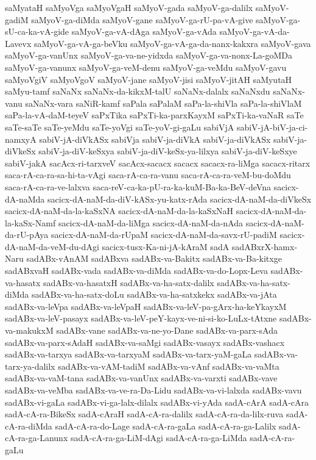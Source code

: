 {saMyataH
saMyoVga
saMyoVgaH
saMyoV-gada
saMyoV-ga-dalilx
saMyoV-gadiM
saMyoV-ga-diMda
saMyoV-gane
saMyoV-ga-rU-pa-vA-give
saMyoV-ga-sU-ca-ka-vA-gide
saMyoV-ga-vA-dAga
saMyoV-ga-vAda
saMyoV-ga-vA-da-Lavevx
saMyoV-ga-vA-ga-beVku
saMyoV-ga-vA-ga-da-nanx-kakxra
saMyoV-gava
saMyoV-ga-vanUnx
saMyoV-ga-va-ne-yidxda
saMyoV-ga-va-nonx-La-goMDa
saMyoV-ga-vanunx
saMyoV-ga-veM-denu
saMyoV-ga-veMdu
saMyoV-gavu
saMyoVgiV
saMyoVgoV
saMyoV-jane
saMyoV-jisi
saMyoV-jitAH
saMyutaH
saMyu-tamf
saNaNx
saNaNx-da-kikxM-talU
saNaNx-dalalx
saNaNxdu
saNaNx-vanu
saNaNx-vara
saNiR-kamf
saPala
saPalaM
saPa-la-shiVla
saPa-la-shiVlaM
saPa-la-vA-daM-teyeV
saPxTika
saPxTi-ka-parxKayxM
saPxTi-ka-vaNaR
saTe
saTe-saTe
saTe-yeMdu
saTe-yoVgi
saTe-yoV-gi-gaLu
sabiVjA
sabiV-jA-biV-ja-ci-namxyA
sabiV-jA-diVkASx
sabiVja
sabiV-ja-diVkA
sabiV-ja-diVkASx
sabiV-ja-diVkeSx
sabiV-ja-diV-keSxya
sabiV-ja-diV-keSx-ya-lilxya
sabiV-ja-diV-keSxye
sabiV-jakA
sacAcx-ri-tarxveV
sacAcx-sacacx
sacacx
sacacx-ra-liMga
sacacx-ritarx
saca-rA-ca-ra-sa-hi-ta-vAgi
saca-rA-ca-ra-vanu
saca-rA-ca-ra-veM-bu-doMdu
saca-rA-ca-ra-ve-lalxva
saca-reV-ca-ka-pU-ra-ka-kuM-Ba-ka-BeV-deVna
sacicx-dA-naMda
sacicx-dA-naM-da-diV-kASx-yu-katx-rAda
sacicx-dA-naM-da-diVkeSx
sacicx-dA-naM-da-la-kaSxNA
sacicx-dA-naM-da-la-kaSxNaH
sacicx-dA-naM-da-la-kaSx-Namf
sacicx-dA-naM-da-liMga
sacicx-dA-naM-da-nAda
sacicx-dA-naM-da-rU-pAya
sacicx-dA-naM-da-rUpaM
sacicx-dA-naM-da-savx-rU-padiM
sacicx-dA-naM-da-veM-du-dAgi
sacicx-tusx-Ka-ni-jA-kAraM
sadA
sadABxrX-hamx-Naru
sadABx-vAnAM
sadABxva
sadABx-va-Bakitx
sadABx-va-Ba-kitxge
sadABxvaH
sadABx-vada
sadABx-va-diMda
sadABx-va-do-Lopx-Leva
sadABx-va-hasatx
sadABx-va-hasatxH
sadABx-va-ha-satx-dalilx
sadABx-va-ha-satx-diMda
sadABx-va-ha-satx-doLu
sadABx-va-ha-satxkekx
sadABx-va-jAta
sadABx-va-leVpa
sadABx-va-leVpaH
sadABx-va-leV-pa-gArx-ha-keYkayxM
sadABx-va-leV-pasayx
sadABx-va-leV-peY-kayx-ve-ni-si-ko-LuLx-tAtxne
sadABx-va-makukxM
sadABx-vane
sadABx-va-ne-yo-Dane
sadABx-va-parx-sAda
sadABx-va-parx-sAdaH
sadABx-va-saMgi
sadABx-vasayx
sadABx-vashacx
sadABx-va-tarxya
sadABx-va-tarxyaM
sadABx-va-tarx-yaM-gaLa
sadABx-va-tarx-ya-dalilx
sadABx-va-vAM-tadiM
sadABx-va-vAnf
sadABx-va-vaMta
sadABx-va-vaM-tana
sadABx-va-vanUnx
sadABx-va-varxti
sadABx-vave
sadABx-va-veMba
sadABx-va-ve-ra-Da-Lidu
sadABx-va-vi-lalxda
sadABx-vavu
sadABx-vi-gaLa
sadABx-vi-ga-lalx-dilalx
sadABx-vi-yAda
sadA-cArA
sadA-cAra
sadA-cA-ra-BikeSx
sadA-cAraH
sadA-cA-ra-dalilx
sadA-cA-ra-da-lilx-ruva
sadA-cA-ra-diMda
sadA-cA-ra-do-Lage
sadA-cA-ra-gaLa
sadA-cA-ra-ga-Lalilx
sadA-cA-ra-ga-Lanunx
sadA-cA-ra-ga-LiM-dAgi
sadA-cA-ra-ga-LiMda
sadA-cA-ra-gaLu
}
